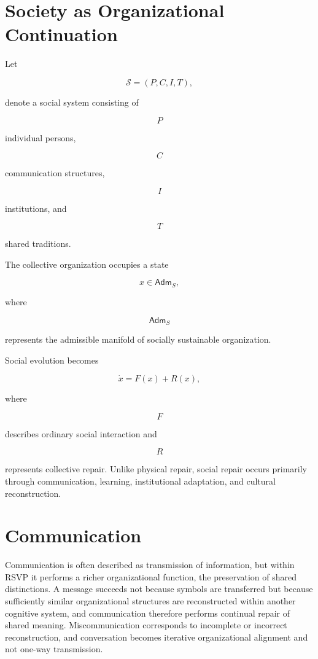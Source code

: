 \documentclass[11pt,oneside]{book}
\numberwithin{equation}{chapter}
\theoremstyle{definition}
\theoremstyle{plain}
\newcommand{\Adm}{\mathsf{Adm}}
\begin{document}
\section{Society as Organizational Continuation}

Let

\[
\mathcal S
=
(P,C,I,T),
\]

denote a social system consisting of

\[
P
\]

individual persons,

\[
C
\]

communication structures,

\[
I
\]

institutions, and

\[
T
\]

shared traditions.

The collective organization occupies a state

\[
x
\in
\Adm_S,
\]

where

\[
\Adm_S
\]

represents the admissible manifold of socially sustainable organization.

Social evolution becomes

\[
\dot x
=
F(x)
+
R(x),
\]

where

\[
F
\]

describes ordinary social interaction and

\[
R
\]

represents collective repair. Unlike physical repair, social repair occurs primarily through communication, learning, institutional adaptation, and cultural reconstruction.

\section{Communication}

Communication is often described as transmission of information, but within RSVP it performs a richer organizational function, the preservation of shared distinctions. A message succeeds not because symbols are transferred but because sufficiently similar organizational structures are reconstructed within another cognitive system, and communication therefore performs continual repair of shared meaning. Miscommunication corresponds to incomplete or incorrect reconstruction, and conversation becomes iterative organizational alignment and not one-way transmission.
\end{document}
